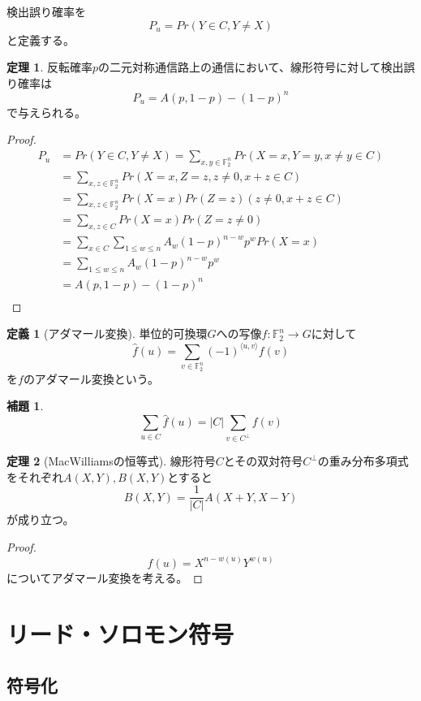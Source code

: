\documentclass{jsarticle}
\newcommand{\F}{\mathbb{F}}
\renewcommand{\(}{\left(}
\renewcommand{\)}{\right)}
\newcommand{\braket}[1]{\langle #1 \rangle}
\theoremstyle{definition}
\newtheorem{dfn}{定義}
\newtheorem{lem}{補題}
\newtheorem{thm}{定理}
\begin{document}
検出誤り確率を
    \[P_u = Pr(Y \in C, Y \neq X)\]
と定義する。

\begin{thm}
    反転確率$p$の二元対称通信路上の通信において、線形符号に対して検出誤り確率は
        \[P_u = A(p, 1-p) - (1-p)^n\]
    で与えられる。
\end{thm}
\begin{proof}
    \begin{align*}
        P_u
        &= Pr(Y \in C, Y \neq X) = \sum_{x, y \in \F_2^n} Pr(X = x, Y = y, x \neq y \in C)\\
        &= \sum_{x, z \in \F_2^n} Pr(X = x, Z = z, z \neq 0, x + z \in C)\\
        &= \sum_{x, z \in \F_2^n} Pr(X = x)Pr(Z = z) (z \neq 0, x + z \in C)\\
        &= \sum_{x, z \in C} Pr(X = x)Pr(Z = z \neq 0)\\
        &= \sum_{x \in C}\sum_{1 \leq w \leq n} A_w(1-p)^{n-w}p^w Pr(X = x)\\
        &= \sum_{1 \leq w \leq n} A_w(1-p)^{n-w}p^w\\
        &= A(p, 1-p) - (1-p)^n\\
    \end{align*}
\end{proof}

\begin{dfn}[アダマール変換]
    単位的可換環$G$への写像$f: \F_2^n \rightarrow G$に対して
        \[\hat{f}(u) = \sum_{v \in \F_2^n} (-1)^{\braket{u, v}} f(v)\]
    を$f$のアダマール変換という。
\end{dfn}
\begin{lem}
        \[\sum_{u \in C}\hat{f}(u) = |C|\sum_{v \in C^\perp}f(v)\]
\end{lem}

\begin{thm}[MacWilliamsの恒等式]
    線形符号$C$とその双対符号$C^\perp$の重み分布多項式をそれぞれ$A(X, Y), B(X, Y)$とすると
        \[B(X, Y) = \frac{1}{|C|}A(X + Y, X - Y)\]
    が成り立つ。
\end{thm}
\begin{proof}
        \[f(u) = X^{n-w(u)}Y^{w(u)}\]
    についてアダマール変換を考える。
\end{proof}

\section{リード・ソロモン符号}

\subsection{符号化}
\end{document}
